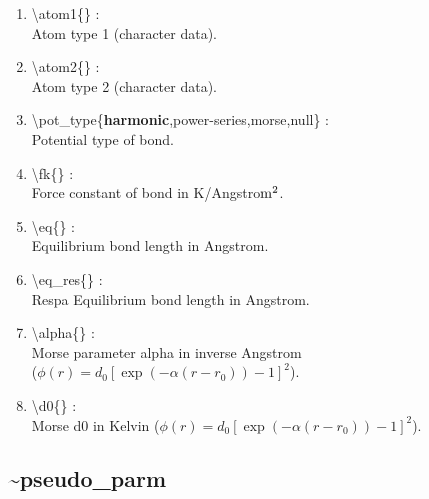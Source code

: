 \documentclass[12pt,titlepage]{article}
\begin{document}
\begin{enumerate}

 \vspace{0.15in} 
 \item  \textbackslash{}atom1\{\} : \\
    Atom type 1 (character data).
   
 \vspace{0.15in} 
 \item  \textbackslash{}atom2\{\} : \\ 
    Atom type 2 (character data).

 \vspace{0.15in} 
 \item  \textbackslash{}pot\_type\{{\bf harmonic},power-series,morse,null\} : \\
     Potential type of bond.

 \vspace{0.15in} 
 \item  \textbackslash{}fk\{\} : \\
     Force constant of bond in K/Angstro${\rm m}^2$.

 \vspace{0.15in} 
 \item  \textbackslash{}eq\{\} : \\
    Equilibrium bond length in Angstrom.

 \vspace{0.15in} 
 \item  \textbackslash{}eq\_res\{\} : \\
     Respa Equilibrium bond length in Angstrom.

 \vspace{0.15in} 
 \item  \textbackslash{}alpha\{\} : \\
    Morse parameter alpha in inverse Angstrom \\
    ($\phi(r) = d_0[\exp(-\alpha(r-r_0))-1]^2$).

 \vspace{0.15in} 
 \item  \textbackslash{}d0\{\} : \\
    Morse d0 in Kelvin
    ($\phi(r) = d_0[\exp(-\alpha(r-r_0))-1]^2$).

\end{enumerate}

\newpage
\subsection*{\bf \~{}pseudo\_parm}
\end{document}

